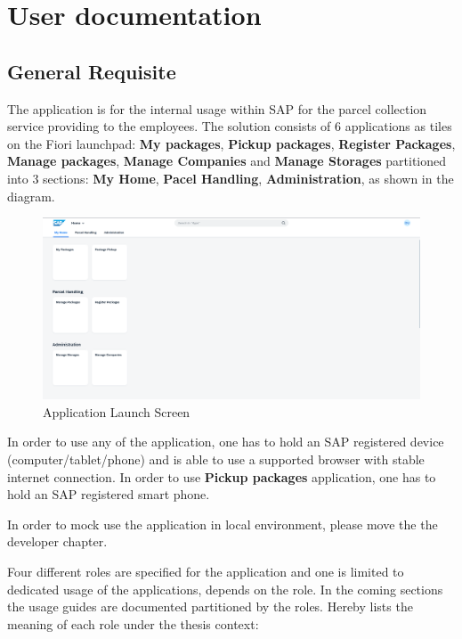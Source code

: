 \chapter{User documentation}
\label{ch:user}

\section{General Requisite}

The application is for the internal usage within SAP for the parcel collection service providing to the employees. The solution consists of 6 applications as tiles on the Fiori launchpad: \textbf{My packages}, \textbf{Pickup packages}, \textbf{Register Packages}, \textbf{Manage packages}, \textbf{Manage Companies} and \textbf{Manage Storages} partitioned into 3 sections: \textbf{My Home}, \textbf{Pacel Handling}, \textbf{Administration}, as shown in the diagram.

\begin{figure}[H]
	\centering
	\includegraphics[width=1\linewidth]{images/user_doc/overviews/sandbox.png}
	\caption{Application Launch Screen}
	\label{fig:ApplicationLaunchScreen}
\end{figure}


In order to use any of the application, one has to hold an SAP registered device (computer/tablet/phone) and is able to use a supported browser with stable internet connection. In order to use \textbf{Pickup packages} application, one has to hold an SAP registered smart phone. 

In order to mock use the application in local environment, please move the the developer chapter. 

Four different roles are specified for the application and one is limited to dedicated usage of the applications, depends on the role. In the coming sections the usage guides are documented partitioned by the roles. Hereby lists the meaning of each role under the thesis context:

